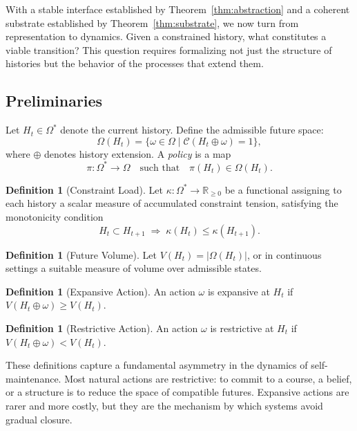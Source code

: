 \documentclass[12pt, a4paper]{article}
\theoremstyle{plain}
\theoremstyle{definition}
\newtheorem{definition}[theorem]{Definition}
\theoremstyle{remark}
\begin{document}
With a stable interface established by Theorem~\ref{thm:abstraction} and a coherent substrate established by Theorem~\ref{thm:substrate}, we now turn from representation to dynamics. Given a constrained history, what constitutes a viable transition? This question requires formalizing not just the structure of histories but the behavior of the processes that extend them.

\subsection{Preliminaries}

Let $H_t \in \Omega^*$ denote the current history. Define the admissible future space:
\[
\Omega(H_t) = \{ \omega \in \Omega \mid \mathcal{C}(H_t \oplus \omega) = 1 \},
\]
where $\oplus$ denotes history extension. A \emph{policy} is a map
\[
\pi : \Omega^* \to \Omega \quad \text{such that} \quad \pi(H_t) \in \Omega(H_t).
\]

\begin{definition}[Constraint Load]
Let $\kappa : \Omega^* \to \mathbb{R}_{\geq 0}$ be a functional assigning to each history a scalar measure of accumulated constraint tension, satisfying the monotonicity condition
\[
H_t \subset H_{t+1} \;\Rightarrow\; \kappa(H_t) \leq \kappa(H_{t+1}).
\]
\end{definition}

\begin{definition}[Future Volume]
Let $V(H_t) = |\Omega(H_t)|$, or in continuous settings a suitable measure of volume over admissible states.
\end{definition}

\begin{definition}[Expansive Action]
An action $\omega$ is expansive at $H_t$ if $V(H_t \oplus \omega) \geq V(H_t)$.
\end{definition}

\begin{definition}[Restrictive Action]
An action $\omega$ is restrictive at $H_t$ if $V(H_t \oplus \omega) < V(H_t)$.
\end{definition}

These definitions capture a fundamental asymmetry in the dynamics of self-maintenance. Most natural actions are restrictive: to commit to a course, a belief, or a structure is to reduce the space of compatible futures. Expansive actions are rarer and more costly, but they are the mechanism by which systems avoid gradual closure.
\end{document}
